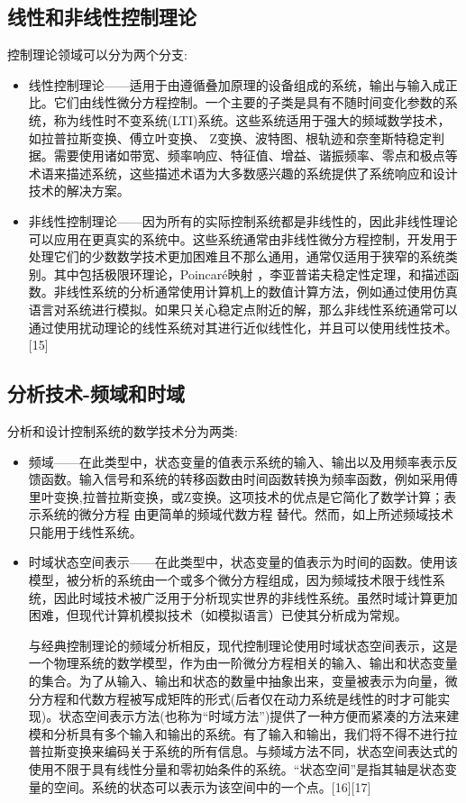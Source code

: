 \subsection{线性和非线性控制理论}

控制理论领域可以分为两个分支:

\begin{itemize}
\item 线性控制理论——适用于由遵循叠加原理的设备组成的系统，输出与输入成正比。它们由线性微分方程控制。一个主要的子类是具有不随时间变化参数的系统，称为线性时不变系统(LTI)系统。这些系统适用于强大的频域数学技术，如拉普拉斯变换、傅立叶变换、 Z变换、波特图、根轨迹和奈奎斯特稳定判据。需要使用诸如带宽、频率响应、特征值、增益、谐振频率、零点和极点等术语来描述系统，这些描述术语为大多数感兴趣的系统提供了系统响应和设计技术的解决方案。
\item 非线性控制理论——因为所有的实际控制系统都是非线性的，因此非线性理论可以应用在更真实的系统中。这些系统通常由非线性微分方程控制，开发用于处理它们的少数数学技术更加困难且不那么通用，通常仅适用于狭窄的系统类别。其中包括极限环理论，Poincaré映射 ，李亚普诺夫稳定性定理，和描述函数。非线性系统的分析通常使用计算机上的数值计算方法，例如通过使用仿真语言对系统进行模拟。如果只关心稳定点附近的解，那么非线性系统通常可以通过使用扰动理论的线性系统对其进行近似线性化，并且可以使用线性技术。[15]
\end{itemize}

\subsection{分析技术-频域和时域}

分析和设计控制系统的数学技术分为两类:

\begin{itemize}
\item 频域——在此类型中，状态变量的值表示系统的输入、输出以及用频率表示反馈函数。输入信号和系统的转移函数由时间函数转换为频率函数，例如采用傅里叶变换,拉普拉斯变换，或Z变换。这项技术的优点是它简化了数学计算；表示系统的微分方程 由更简单的频域代数方程 替代。然而，如上所述频域技术只能用于线性系统。
\item 时域状态空间表示——在此类型中，状态变量的值表示为时间的函数。使用该模型，被分析的系统由一个或多个微分方程组成，因为频域技术限于线性系统，因此时域技术被广泛用于分析现实世界的非线性系统。虽然时域计算更加困难，但现代计算机模拟技术（如模拟语言）已使其分析成为常规。

与经典控制理论的频域分析相反，现代控制理论使用时域状态空间表示，这是一个物理系统的数学模型，作为由一阶微分方程相关的输入、输出和状态变量的集合。为了从输入、输出和状态的数量中抽象出来，变量被表示为向量，微分方程和代数方程被写成矩阵的形式(后者仅在动力系统是线性的时才可能实现)。状态空间表示方法(也称为“时域方法”)提供了一种方便而紧凑的方法来建模和分析具有多个输入和输出的系统。有了输入和输出，我们将不得不进行拉普拉斯变换来编码关于系统的所有信息。与频域方法不同，状态空间表达式的使用不限于具有线性分量和零初始条件的系统。“状态空间”是指其轴是状态变量的空间。系统的状态可以表示为该空间中的一个点。[16][17]

\end{itemize}


